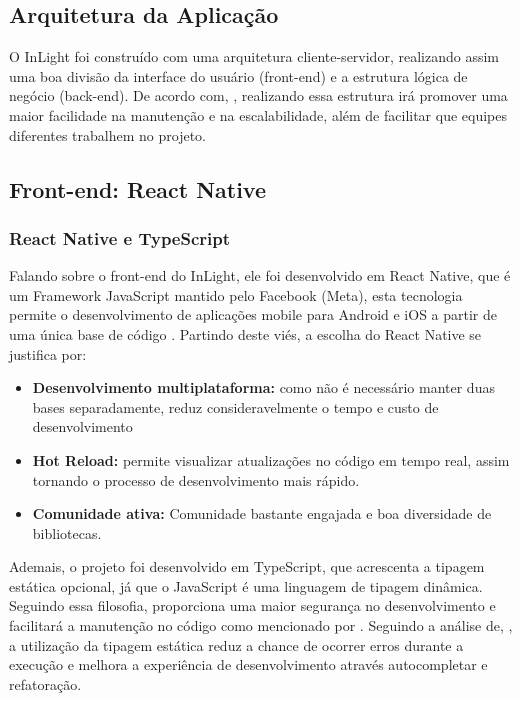 \subsection{Arquitetura da Aplicação}
O InLight foi construído com uma arquitetura cliente-servidor, realizando assim uma boa divisão da interface do usuário (front-end) e a estrutura lógica de negócio (back-end). De acordo com, \cite{pressman2016}, realizando essa estrutura irá promover uma maior facilidade na manutenção e na escalabilidade, além de facilitar que equipes diferentes trabalhem no projeto.
\subsection{Front-end: React Native}

\subsubsection{React Native e TypeScript}

Falando sobre o front-end do InLight, ele foi desenvolvido em React Native, que é um Framework JavaScript mantido pelo Facebook (Meta), esta tecnologia permite o desenvolvimento de aplicações mobile para Android e iOS a partir de uma única base de código \cite{eisenman2015}. Partindo deste viés, a escolha do React Native se justifica por:

\begin{itemize}
    \item \textbf{Desenvolvimento multiplataforma:} como não é necessário manter duas bases separadamente, reduz consideravelmente o tempo e custo de desenvolvimento
    \item \textbf{Hot Reload:} permite visualizar atualizações no código em tempo real, assim tornando o processo de desenvolvimento mais rápido.
    \item \textbf{Comunidade ativa:} Comunidade bastante engajada e boa diversidade de bibliotecas.
\end{itemize}

Ademais, o projeto foi desenvolvido em TypeScript,  que acrescenta a tipagem estática opcional, já que o JavaScript é uma linguagem de tipagem dinâmica. Seguindo essa filosofia, proporciona uma maior segurança no desenvolvimento e facilitará a manutenção no código como mencionado por \cite{bierman2014}.
 Seguindo a análise de, \cite{microsoft2020}, a utilização da tipagem estática reduz a chance de ocorrer erros durante a execução e melhora a experiência de desenvolvimento através autocompletar e refatoração.
